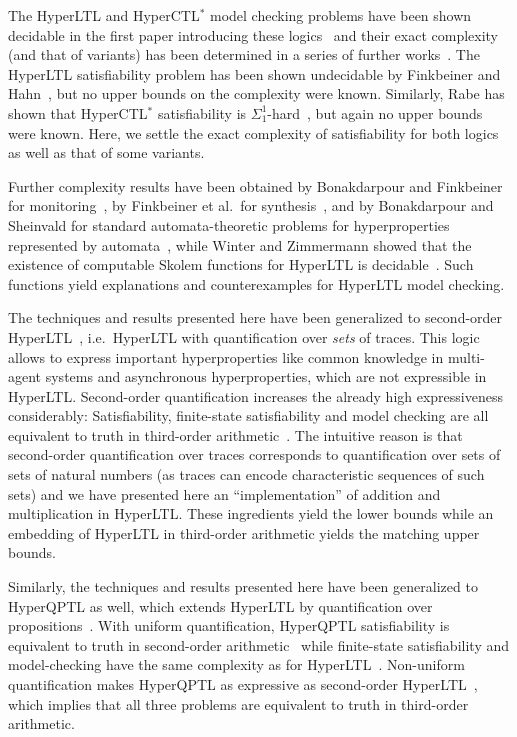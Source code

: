 \documentclass[dvipsnames,10pt,a4paper]{amsart}
\theoremstyle{definition}
\theoremstyle{remark}
\newcommand{\hyltl}{{HyperLTL}\xspace}
\newcommand{\hyqptl}{{HyperQPTL}\xspace}
\newcommand{\hyctlstar}{{HyperCTL$^*$}\xspace}
\newcommand{\myquot}[1]{``#1''}
\begin{document}
The \hyltl and \hyctlstar model checking problems have been shown decidable in the first paper introducing these logics~\cite{ClarksonFKMRS14} and their exact complexity (and that of variants) has been determined in a series of further works~\cite{FinkbeinerRS15,Rabe16,MZ20}. 
The \hyltl satisfiability problem has been shown undecidable by Finkbeiner and Hahn~\cite{FHH18}, but no upper bounds on the complexity were known.
Similarly, Rabe has shown that \hyctlstar satisfiability is $\Sigma_1^1$-hard~\cite{Rabe16}, but again no upper bounds were known.
Here, we settle the exact complexity of satisfiability for both logics as well as that of some variants. 

Further complexity results have been obtained by Bonakdarpour and Finkbeiner for monitoring~\cite{DBLP:conf/csfw/BonakdarpourF18}, by Finkbeiner et al.\ for synthesis~\cite{FinkbeinerHLST20}, and by Bonakdarpour and Sheinvald for standard automata-theoretic problems for hyperproperties represented by automata~\cite{DBLP:journals/iandc/BonakdarpourS23}, while Winter and Zimmermann showed that the existence of computable Skolem functions for \hyltl is decidable~\cite{WZ}. Such
functions yield explanations and counterexamples for \hyltl model checking.

The techniques and results presented here have been generalized to second-order \hyltl~\cite{DBLP:conf/cav/BeutnerFFM23}, i.e.\ \hyltl with quantification over \emph{sets} of traces.
This logic allows to express important hyperproperties like common knowledge in multi-agent systems and asynchronous hyperproperties, which are not expressible in \hyltl.
Second-order quantification increases the already high expressiveness considerably: Satisfiability, finite-state satisfiability and model checking are all equivalent to truth in third-order arithmetic~\cite{sohyltlcomplexity}. 
The intuitive reason is that second-order quantification over traces corresponds to quantification over sets of sets of natural numbers (as traces can encode characteristic sequences of such sets) and we have presented here an \myquot{implementation} of addition and multiplication in \hyltl. These ingredients yield the lower bounds while an embedding of \hyltl in third-order arithmetic yields the matching upper bounds. 

Similarly, the techniques and results presented here have been generalized to \hyqptl as well, which extends \hyltl by quantification over propositions~\cite{Rabe16}. 
With uniform quantification, \hyqptl satisfiability is equivalent to truth in second-order arithmetic~\cite{regaud2024complexityhyperqptl} while finite-state satisfiability and model-checking have the same complexity as for \hyltl~\cite{FinkbeinerH16,Rabe16}. Non-uniform quantification makes \hyqptl as expressive as second-order \hyltl~\cite{regaud2024complexityhyperqptl}, which implies that all three problems are equivalent to truth in third-order arithmetic.
\end{document}
